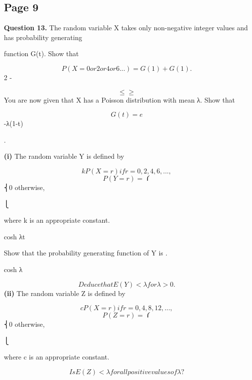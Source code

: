 \documentclass[12pt]{article}
\begin{document}
\subsection*{Page 9}
\begin{flushleft}
\bigskip\textbf{Question 13.} The random variable X takes only non-negative integer values and has probability generating\par
function G(t). Show that\par
\[P(X = 0 or 2 or 4 or 6 . . .) = G (1) + G ( 1) .\]
2 -\par
\[\leq \geq\]
You are now given that X has a Poisson distribution with mean λ. Show that\par
\[G(t) = e\]
-λ(1-t)\par
.\par
\textbf{(i)} The random variable Y is defined by\par
\[kP(X = r) if r = 0, 2, 4, 6, . . . ,\]
\[P(Y = r) = ⎧\]
⎨0 otherwise,\par
⎩\par
where k is an appropriate constant.\par
cosh λt\par
Show that the probability generating function of Y is .\par
cosh λ\par
\[Deduce that E(Y ) < λ for λ > 0 .\]
\textbf{(ii)} The random variable Z is defined by\par
\[cP(X = r) if r = 0, 4, 8, 12, . . . ,\]
\[P(Z = r) = ⎧\]
⎨0 otherwise,\par
⎩\par
where c is an appropriate constant.\par
\[Is E(Z) < λ for all positive values of λ ?\]
\end{flushleft}
\end{document}
